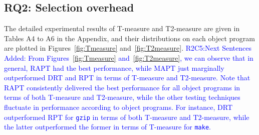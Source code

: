 \documentclass[10pt,journal,compsoc]{IEEEtran}
\begin{document}
\subsection{RQ2: Selection overhead}

The detailed experimental results of T-measure and T2-measure are given in Tables A4 to A6 in the Appendix, and their distributions on each object program are plotted in Figures~\ref{fig:Tmeasure} and~\ref{fig:T2measure}. \textcolor{blue}{R2C5:Next Sentences Added: From Figures~\ref{fig:Tmeasure} and~\ref{fig:T2measure}, we can observe that in general, RAPT had the best performance, while MAPT just marginally outperformed DRT and RPT in terms of T-measure and T2-measure. Note that RAPT consistently delivered the best performance for all object programs in terms of both T-measure and T2-measure, while the other testing techniques fluctuate in performance according to object programs. For instance, DRT outperformed RPT for \texttt{gzip} in terms of both T-measure and T2-measure, while the latter outperformed the former in terms of T-measure for \texttt{make}.}
\end{document}
